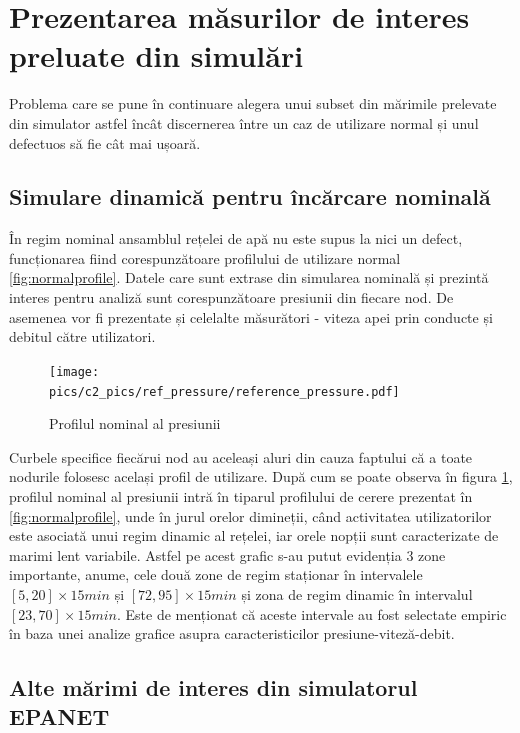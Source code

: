 \section{Prezentarea măsurilor de interes preluate din simulări}

Problema care se pune în continuare alegera unui subset din mărimile prelevate din simulator astfel încât discernerea între un caz de utilizare normal și unul defectuos să fie cât mai ușoară. 


\subsection{Simulare dinamică pentru încărcare nominală}
În regim nominal ansamblul rețelei de apă nu este supus la nici un defect, funcționarea fiind corespunzătoare profilului de utilizare normal \ref{fig:normalprofile}. Datele care sunt extrase din simularea nominală și prezintă interes pentru analiză sunt corespunzătoare presiunii din fiecare nod. De asemenea vor fi prezentate și celelalte măsurători - viteza apei prin conducte și debitul către utilizatori.

\begin{figure}[h]
\centering
\texttt{[image: \\pics/c2\_pics/ref\_pressure/reference\_pressure.pdf]}
\caption{Profilul nominal al presiunii}
\label{fig:ref_presssure}
\end{figure}
Curbele specifice fiecărui nod au aceleași aluri din cauza faptului că a toate nodurile folosesc același profil de utilizare.
După cum se poate observa în figura \ref{fig:ref_presssure}, profilul nominal al presiunii intră în tiparul profilului de cerere prezentat în \ref{fig:normalprofile}, unde în jurul orelor dimineții, când activitatea utilizatorilor este asociată unui regim dinamic al rețelei, iar orele nopții sunt caracterizate de marimi lent variabile. Astfel pe acest grafic s-au putut evidenția 3 zone importante, anume, cele două zone de regim staționar în intervalele $[5, 20] \times 15min$ și $[72,95] \times 15min$ și zona de regim dinamic în intervalul $[23,70]\times 15min$. Este de menționat că aceste intervale au fost selectate empiric în baza unei analize grafice asupra caracteristicilor presiune-viteză-debit.

\subsection{Alte mărimi de interes din simulatorul EPANET}

